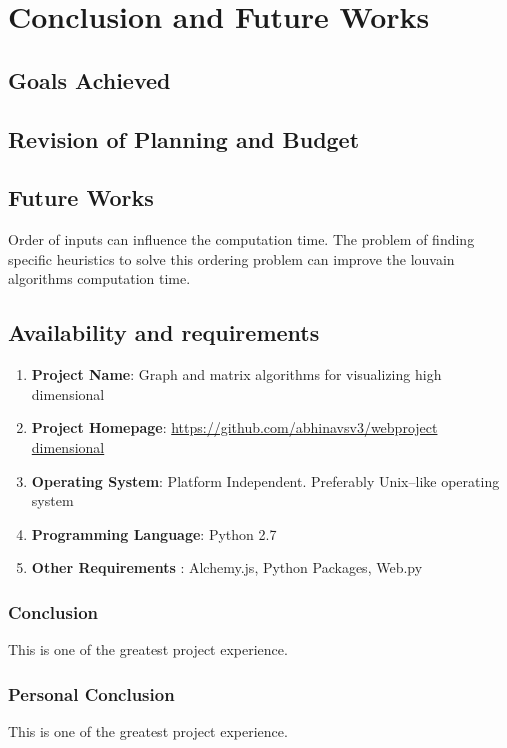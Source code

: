 \chapter{Conclusion and Future Works}
\section{Goals Achieved}
\section{Revision of Planning and Budget}
\section{Future Works}
Order of inputs can influence the computation time. The problem of finding specific heuristics to solve this ordering problem can improve the louvain algorithms computation time.
\section{Availability and requirements}
\begin{enumerate}
\item \textbf{Project Name}: Graph and matrix algorithms for visualizing high dimensional
\item \textbf{Project Homepage}: \url{https://github.com/abhinavsv3/webproject dimensional}
\item \textbf{Operating System}: Platform Independent. Preferably Unix--like operating system
\item \textbf{Programming Language}: Python 2.7
\item \textbf{Other Requirements} : Alchemy.js, Python Packages, Web.py
\end{enumerate}

\subsection{Conclusion}
This is one of the greatest project experience.	
\subsection{Personal Conclusion}
This is one of the greatest project experience.	

\lstlistoflistings


{}




